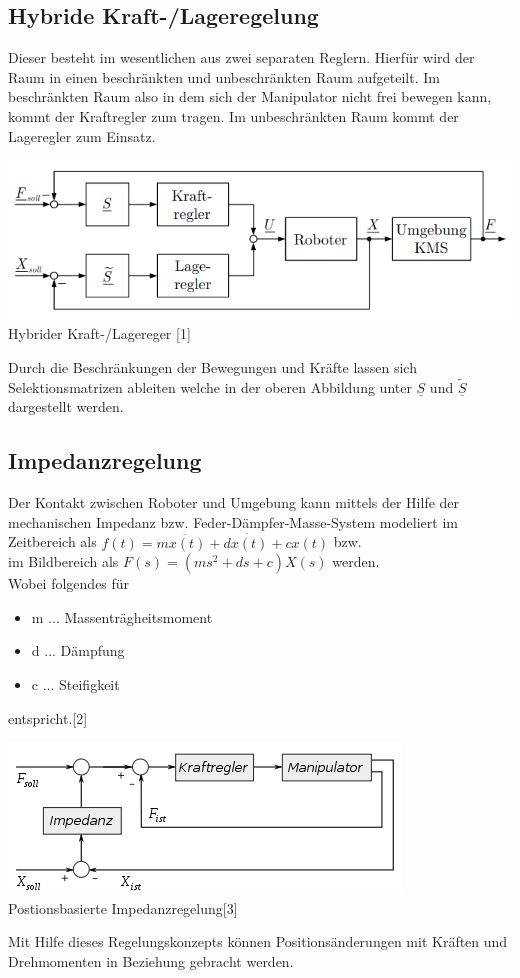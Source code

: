 \documentclass[12pt]{article}
\begin{document}
\subsection{Hybride Kraft-/Lageregelung}
Dieser besteht im wesentlichen aus zwei separaten Reglern. Hierfür wird der Raum in einen beschränkten und unbeschränkten Raum aufgeteilt. Im beschränkten Raum also in dem sich der Manipulator nicht frei bewegen kann, kommt der Kraftregler zum tragen. Im unbeschränkten Raum kommt der Lageregler zum Einsatz.
\begin{center}
\includegraphics[scale=0.65]{img/Hybride_Kraft_Lageregelung}
Hybrider Kraft-/Lagereger [1]
\end{center}
Durch die Beschränkungen der Bewegungen und Kräfte lassen sich Selektionsmatrizen ableiten welche in der oberen Abbildung unter $\underline{S}$ und $\widetilde{\underline{S}}$ dargestellt werden.

\subsection{Impedanzregelung}
Der Kontakt zwischen Roboter und Umgebung kann mittels der Hilfe der mechanischen Impedanz bzw. Feder-Dämpfer-Masse-System modeliert im Zeitbereich als
$f(t) = m \ddot{x(t)} + d \dot{x(t)} + c x(t)$ bzw.\\ im Bildbereich als $F(s) = (ms^2 + ds + c) X(s)$ werden.\\ Wobei folgendes für
\begin{itemize}
\item m ... Massenträgheitsmoment
\item d ... Dämpfung
\item c ... Steifigkeit
\end{itemize}
entspricht.[2]
\begin{center}
\includegraphics[scale=0.8]{img/Impedanzregler}\\
Postionsbasierte Impedanzregelung[3]
\end{center}
Mit Hilfe dieses Regelungskonzepts können Positionsänderungen mit Kräften und Drehmomenten in Beziehung gebracht werden.
\end{document}
